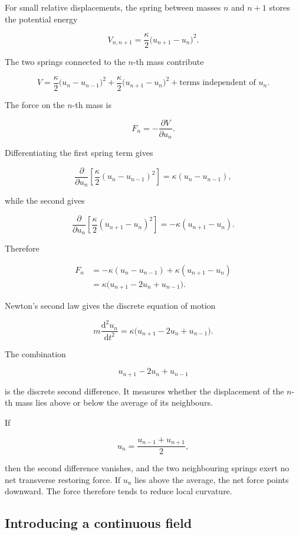 For small relative displacements, the spring between masses \(n\) and \(n+1\) stores the potential energy

\[
V_{n,n+1}
=
\frac{\kappa}{2}
\bigl(u_{n+1}-u_{n}\bigr)^{2}.
\]

The two springs connected to the \(n\)-th mass contribute

\[
V
=
\frac{\kappa}{2}
\bigl(u_{n}-u_{n-1}\bigr)^{2}
+
\frac{\kappa}{2}
\bigl(u_{n+1}-u_{n}\bigr)^{2}
+
\text{terms independent of }u_{n}.
\]

The force on the \(n\)-th mass is

\[
F_{n}
=
-\frac{\partial V}{\partial u_{n}}.
\]

Differentiating the first spring term gives

\[
\frac{\partial}{\partial u_{n}}
\left[
\frac{\kappa}{2}
(u_{n}-u_{n-1})^{2}
\right]
=
\kappa(u_{n}-u_{n-1}),
\]

while the second gives

\[
\frac{\partial}{\partial u_{n}}
\left[
\frac{\kappa}{2}
(u_{n+1}-u_{n})^{2}
\right]
=
-\kappa(u_{n+1}-u_{n}).
\]

Therefore

\[
\begin{aligned}
F_{n}
&=
-\kappa(u_{n}-u_{n-1})
+\kappa(u_{n+1}-u_{n})\\
&=
\kappa
\bigl(u_{n+1}-2u_{n}+u_{n-1}\bigr).
\end{aligned}
\]

Newton's second law gives the discrete equation of motion

\[
\boxed{
m\frac{\mathrm{d}^{2}u_{n}}{\mathrm{d}t^{2}}
=
\kappa
\bigl(u_{n+1}-2u_{n}+u_{n-1}\bigr)
}.
\]

The combination

\[
u_{n+1}-2u_{n}+u_{n-1}
\]

is the discrete second difference. It measures whether the displacement of the \(n\)-th mass lies above or below the average of its neighbours.

If

\[
u_{n}=\frac{u_{n-1}+u_{n+1}}{2},
\]

then the second difference vanishes, and the two neighbouring springs exert no net transverse restoring force. If \(u_{n}\) lies above the average, the net force points downward. The force therefore tends to reduce local curvature.

\subsection{Introducing a continuous field}

